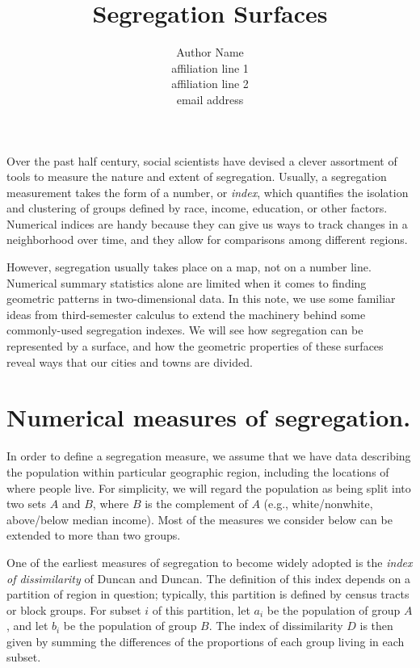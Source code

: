 \documentclass{article}
\theoremstyle{theorem}
\theoremstyle{definition}
\begin{document}
\title{Segregation Surfaces}

\author{Author Name\\               %
\scriptsize affiliation line 1\\    %
affiliation line 2\\                %
email address}                      %

\maketitle

\noindent Over the past half century, social scientists have devised a clever assortment of tools to measure the nature and extent of segregation. \cite{harrisjohnson18} Usually, a segregation measurement takes the form of a number, or \textit{index}, which quantifies the isolation and clustering of groups defined by race, income, education, or other factors. Numerical indices are handy because they can give us ways to track changes in a neighborhood over time, and they allow for comparisons among different regions.

However, segregation usually takes place on a map, not on a number line. Numerical summary statistics alone are limited when it comes to finding geometric patterns in two-dimensional data. In this note, we use some familiar ideas from third-semester calculus to extend the machinery behind some commonly-used segregation indexes. We will see how segregation can be represented by a surface, and how the geometric properties of these surfaces reveal ways that our cities and towns are divided.

\section{Numerical measures of segregation.}

In order to define a segregation measure, we assume that we have data describing the population within particular geographic region, including the locations of where people live. For simplicity, we will regard the population as being split into two sets $A$ and $B$, where $B$ is the complement of $A$ (e.g., white/nonwhite, above/below median income). Most of the measures we consider below can be extended to more than two groups.

One of the earliest measures of segregation to become widely adopted is the \textit{index of dissimilarity} of Duncan and Duncan. \cite{duncan55} The definition of this index depends on a partition of region in question; typically, this partition is defined by census tracts or block groups. For subset $i$ of this partition, let $a_i$ be the population of group $A$, and let $b_i$ be the population of group $B$. The index of dissimilarity $D$ is then given by summing the differences of the proportions of each group living in each subset.
\end{document}
